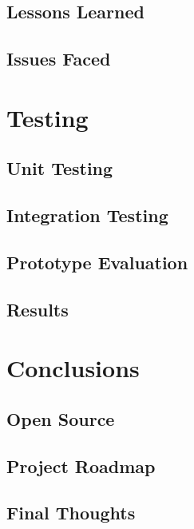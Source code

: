 \documentclass{l4proj}
\begin{document}
\section{Lessons Learned}

\section{Issues Faced}


\chapter{Testing}
\label{testing}

\section{Unit Testing}

\section{Integration Testing}

\section{Prototype Evaluation}

\section{Results}


\chapter{Conclusions}
\label{conclusions}

\section{Open Source}

\section{Project Roadmap}

\section{Final Thoughts}



\end{document}
